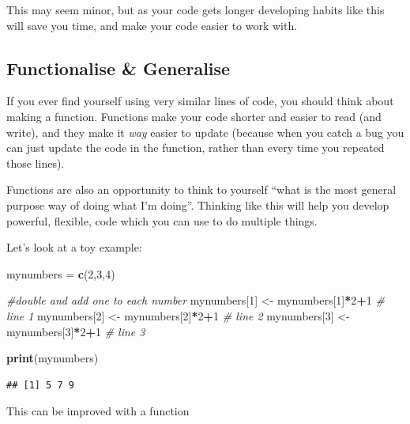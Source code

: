 \documentclass[]{book}
\newenvironment{Shaded}{\begin{snugshade}}{\end{snugshade}}
\newcommand{\KeywordTok}[1]{\textcolor[rgb]{0.13,0.29,0.53}{\textbf{#1}}}
\newcommand{\DecValTok}[1]{\textcolor[rgb]{0.00,0.00,0.81}{#1}}
\newcommand{\StringTok}[1]{\textcolor[rgb]{0.31,0.60,0.02}{#1}}
\newcommand{\CommentTok}[1]{\textcolor[rgb]{0.56,0.35,0.01}{\textit{#1}}}
\newcommand{\OperatorTok}[1]{\textcolor[rgb]{0.81,0.36,0.00}{\textbf{#1}}}
\newcommand{\NormalTok}[1]{#1}
\begin{document}
This may seem minor, but as your code gets longer developing habits like
this will save you time, and make your code easier to work with.

\subsection{Functionalise \& Generalise}\label{functionalise-generalise}

If you ever find yourself using very similar lines of code, you should
think about making a function. Functions make your code shorter and
easier to read (and write), and they make it \emph{way} easier to update
(because when you catch a bug you can just update the code in the
function, rather than every time you repeated those lines).

Functions are also an opportunity to think to yourself ``what is the
most general purpose way of doing what I'm doing''. Thinking like this
will help you develop powerful, flexible, code which you can use to do
multiple things.

Let's look at a toy example:

\begin{Shaded}
\begin{Highlighting}[]
\NormalTok{mynumbers =}\StringTok{ }\KeywordTok{c}\NormalTok{(}\DecValTok{2}\NormalTok{,}\DecValTok{3}\NormalTok{,}\DecValTok{4}\NormalTok{)}

\CommentTok{#double and add one to each number}
\NormalTok{mynumbers[}\DecValTok{1}\NormalTok{] <-}\StringTok{ }\NormalTok{mynumbers[}\DecValTok{1}\NormalTok{]}\OperatorTok{*}\DecValTok{2}\OperatorTok{+}\DecValTok{1} \CommentTok{# line 1}
\NormalTok{mynumbers[}\DecValTok{2}\NormalTok{] <-}\StringTok{ }\NormalTok{mynumbers[}\DecValTok{2}\NormalTok{]}\OperatorTok{*}\DecValTok{2}\OperatorTok{+}\DecValTok{1} \CommentTok{# line 2}
\NormalTok{mynumbers[}\DecValTok{3}\NormalTok{] <-}\StringTok{ }\NormalTok{mynumbers[}\DecValTok{3}\NormalTok{]}\OperatorTok{*}\DecValTok{2}\OperatorTok{+}\DecValTok{1} \CommentTok{# line 3}

\KeywordTok{print}\NormalTok{(mynumbers)}
\end{Highlighting}
\end{Shaded}

\begin{verbatim}
## [1] 5 7 9
\end{verbatim}

This can be improved with a function
\end{document}
